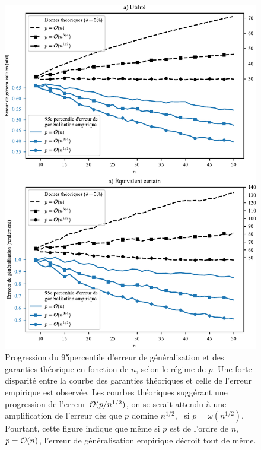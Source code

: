 \begin{figure}[h!]
  \centering
  \includegraphics[width=\textwidth]{../experiments/fig/bound_npgenu.pdf}
  \caption{Progression du 95\ieme percentile d'erreur de généralisation et des garanties
    théorique en fonction de $n$, selon le régime de $p$. Une forte disparité entre la
    courbe des garanties théoriques et celle de l'erreur empirique est observée. Les
    courbes théoriques suggérant une progression de l'erreur $\mathcal O(p/n^{1/2})$, on se
    serait attendu à une amplification de l'erreur dès que $p$ domine $n^{1/2}$, \ie\ si
    $p=\omega(n^{1/2})$. Pourtant, cette figure indique que même si $p$ est de l'ordre de
    $n$, \ie\ $p = \mathcal O(n)$, l'erreur de généralisation empirique décroit tout de même.  }
  \label{fig_bound_npgenu}
\end{figure}

